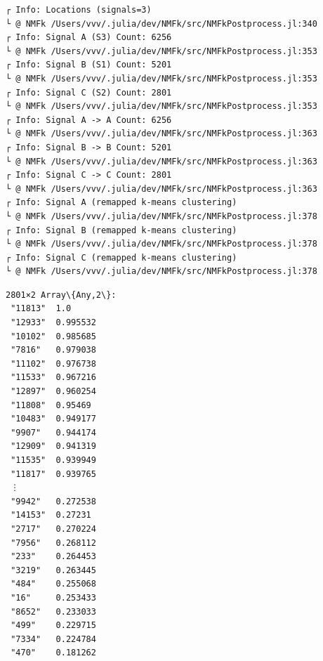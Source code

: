 \documentclass[11pt]{article}
\begin{document}
    
    \begin{Verbatim}[commandchars=\\\{\}]
┌ Info: Locations (signals=3)
└ @ NMFk /Users/vvv/.julia/dev/NMFk/src/NMFkPostprocess.jl:340
┌ Info: Signal A (S3) Count: 6256
└ @ NMFk /Users/vvv/.julia/dev/NMFk/src/NMFkPostprocess.jl:353
┌ Info: Signal B (S1) Count: 5201
└ @ NMFk /Users/vvv/.julia/dev/NMFk/src/NMFkPostprocess.jl:353
┌ Info: Signal C (S2) Count: 2801
└ @ NMFk /Users/vvv/.julia/dev/NMFk/src/NMFkPostprocess.jl:353
┌ Info: Signal A -> A Count: 6256
└ @ NMFk /Users/vvv/.julia/dev/NMFk/src/NMFkPostprocess.jl:363
┌ Info: Signal B -> B Count: 5201
└ @ NMFk /Users/vvv/.julia/dev/NMFk/src/NMFkPostprocess.jl:363
┌ Info: Signal C -> C Count: 2801
└ @ NMFk /Users/vvv/.julia/dev/NMFk/src/NMFkPostprocess.jl:363
┌ Info: Signal A (remapped k-means clustering)
└ @ NMFk /Users/vvv/.julia/dev/NMFk/src/NMFkPostprocess.jl:378
┌ Info: Signal B (remapped k-means clustering)
└ @ NMFk /Users/vvv/.julia/dev/NMFk/src/NMFkPostprocess.jl:378
┌ Info: Signal C (remapped k-means clustering)
└ @ NMFk /Users/vvv/.julia/dev/NMFk/src/NMFkPostprocess.jl:378
    \end{Verbatim}

    
    \begin{Verbatim}[commandchars=\\\{\}]
2801×2 Array\{Any,2\}:
 "11813"  1.0
 "12933"  0.995532
 "10102"  0.985685
 "7816"   0.979038
 "11102"  0.976738
 "11533"  0.967216
 "12897"  0.960254
 "11808"  0.95469
 "10483"  0.949177
 "9907"   0.944174
 "12909"  0.941319
 "11535"  0.939949
 "11817"  0.939765
 ⋮        
 "9942"   0.272538
 "14153"  0.27231
 "2717"   0.270224
 "7956"   0.268112
 "233"    0.264453
 "3219"   0.263445
 "484"    0.255068
 "16"     0.253433
 "8652"   0.233033
 "499"    0.229715
 "7334"   0.224784
 "470"    0.181262
    \end{Verbatim}

    
    \begin{center}
    \end{center}
    { \hspace*{\fill} \\}
    
    \begin{center}
    \end{center}
    { \hspace*{\fill} \\}
    
\end{document}
